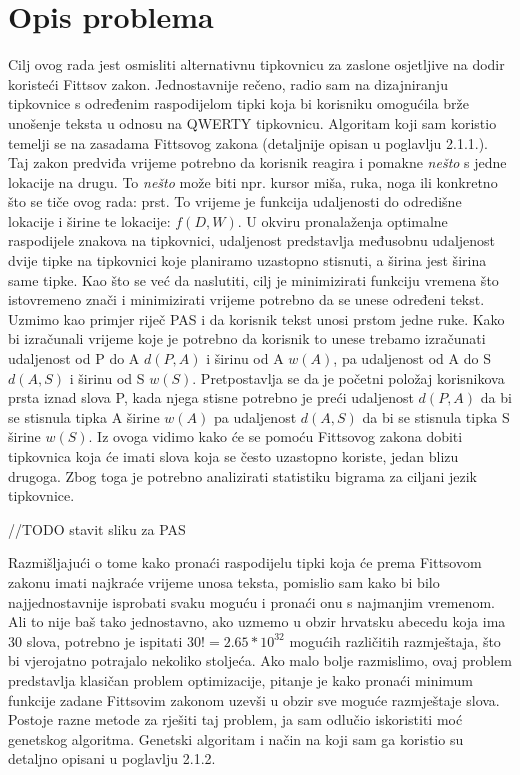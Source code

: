 \documentclass[times, utf8, zavrsni]{fer}
\begin{document}
\section{Opis problema}
Cilj ovog rada jest osmisliti alternativnu tipkovnicu za zaslone osjetljive na dodir koristeći Fittsov zakon. Jednostavnije rečeno, radio sam na dizajniranju tipkovnice s određenim raspodijelom tipki koja bi korisniku omogućila brže unošenje teksta u odnosu na QWERTY tipkovnicu. Algoritam koji sam koristio temelji se na zasadama Fittsovog zakona (detaljnije opisan u poglavlju 2.1.1.). Taj zakon predviđa vrijeme potrebno da korisnik reagira i pomakne \emph{nešto} s jedne lokacije na drugu. To \emph{nešto} može biti npr. kursor miša, ruka, noga ili konkretno što se tiče ovog rada: prst. To vrijeme je funkcija udaljenosti do odredišne lokacije i širine te lokacije: $f(D,W)$. U okviru pronalaženja optimalne raspodijele znakova na tipkovnici, udaljenost predstavlja međusobnu udaljenost dvije tipke na tipkovnici koje planiramo uzastopno stisnuti, a širina jest širina same tipke. Kao što se već da naslutiti, cilj je minimizirati funkciju vremena što istovremeno znači i minimizirati vrijeme potrebno da se unese određeni tekst. Uzmimo kao primjer riječ PAS i da korisnik tekst unosi prstom jedne ruke. Kako bi izračunali vrijeme koje je potrebno da korisnik to unese trebamo izračunati udaljenost od P do A $d(P,A)$ i širinu od A $w(A)$, pa udaljenost od A do S $d(A,S)$ i širinu od S $w(S)$. Pretpostavlja se da je početni položaj korisnikova prsta iznad slova P, kada njega stisne potrebno je preći udaljenost $d(P,A)$ da bi se stisnula tipka A širine $w(A)$ pa udaljenost $d(A,S)$ da bi se stisnula tipka S širine $w(S)$. Iz ovoga vidimo kako će se pomoću Fittsovog zakona dobiti tipkovnica koja će imati slova koja se često uzastopno koriste, jedan blizu drugoga. Zbog toga je potrebno analizirati statistiku bigrama za ciljani jezik tipkovnice.

//TODO stavit sliku za PAS

Razmišljajući o tome kako pronaći raspodijelu tipki koja će prema Fittsovom zakonu imati najkraće vrijeme unosa teksta, pomislio sam kako bi bilo najjednostavnije isprobati svaku moguću i pronaći onu s najmanjim vremenom. Ali to nije baš tako jednostavno, ako uzmemo u obzir hrvatsku abecedu koja ima 30 slova, potrebno je ispitati $30! = 2.65*10^{32}$ mogućih različitih razmještaja, što bi vjerojatno potrajalo nekoliko stoljeća. Ako malo bolje razmislimo, ovaj problem predstavlja klasičan problem optimizacije, pitanje je kako pronaći minimum funkcije zadane Fittsovim zakonom uzevši u obzir sve moguće razmještaje slova. Postoje razne metode za rješiti taj problem, ja sam odlučio iskoristiti moć genetskog algoritma. Genetski algoritam i način na koji sam ga koristio su detaljno opisani u poglavlju 2.1.2.
\end{document}
